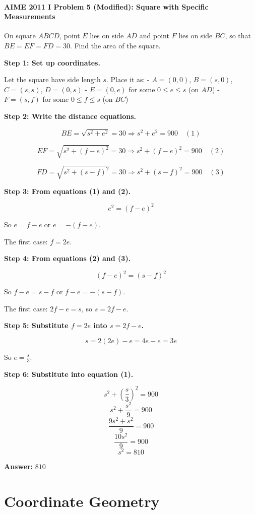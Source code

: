 ﻿\documentclass[12pt]{extarticle}
\begin{document}
\paragraph{AIME 2011 I Problem 5 (Modified): Square with Specific Measurements}

On square $ABCD$, point $E$ lies on side $AD$ and point $F$ lies on side $BC$, so that $BE = EF = FD = 30$. Find the area of the square.

\begin{solutionbox}
\textbf{Step 1: Set up coordinates.}

Let the square have side length $s$. Place it as:
- $A = (0, 0)$, $B = (s, 0)$, $C = (s, s)$, $D = (0, s)$
- $E = (0, e)$ for some $0 \le e \le s$ (on $AD$)
- $F = (s, f)$ for some $0 \le f \le s$ (on $BC$)

\textbf{Step 2: Write the distance equations.}

\[BE = \sqrt{s^2 + e^2} = 30 \Rightarrow s^2 + e^2 = 900 \quad (1)\]

\[EF = \sqrt{s^2 + (f-e)^2} = 30 \Rightarrow s^2 + (f-e)^2 = 900 \quad (2)\]

\[FD = \sqrt{s^2 + (s-f)^2} = 30 \Rightarrow s^2 + (s-f)^2 = 900 \quad (3)\]

\textbf{Step 3: From equations (1) and (2).}

\[e^2 = (f-e)^2\]

So $e = f - e$ or $e = -(f-e)$.

The first case: $f = 2e$.

\textbf{Step 4: From equations (2) and (3).}

\[(f-e)^2 = (s-f)^2\]

So $f - e = s - f$ or $f - e = -(s-f)$.

The first case: $2f - e = s$, so $s = 2f - e$.

\textbf{Step 5: Substitute $f = 2e$ into $s = 2f - e$.}

\[s = 2(2e) - e = 4e - e = 3e\]

So $e = \frac{s}{3}$.

\textbf{Step 6: Substitute into equation (1).}

\[s^2 + (\frac{s}{3})^2 = 900\]
\[s^2 + \frac{s^2}{9} = 900\]
\[\frac{9s^2 + s^2}{9} = 900\]
\[\frac{10s^2}{9} = 900\]
\[s^2 = 810\]

\textbf{Answer:} $\boxed{810}$
\end{solutionbox}

\section{Coordinate Geometry}
\end{document}
